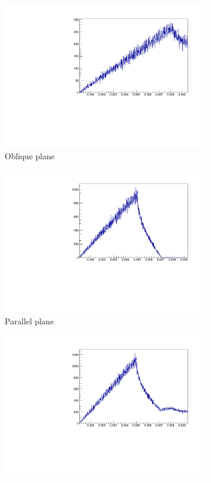 \begin{figure}[H]
\centering
\begin{subfigure}{.32\textwidth}
	\includegraphics[width=\linewidth]{fig/orig_plane1.pdf}
	\caption{Oblique plane}
\end{subfigure}%
\begin{subfigure}{.32\textwidth}
	\includegraphics[width=\linewidth]{fig/orig_plane2.pdf}
	\caption{Parallel plane}
\end{subfigure}%
\begin{subfigure}{.32\textwidth}
	\includegraphics[width=\linewidth]{fig/orig_superposition.pdf}

\end{subfigure}
\end{figure}
